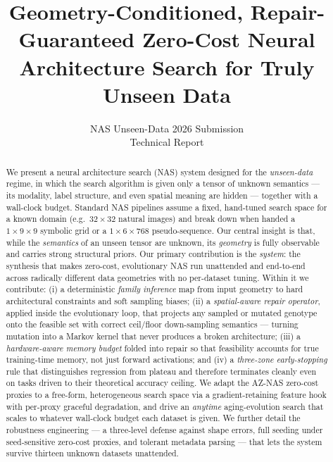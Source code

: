 \documentclass[10pt,twocolumn]{article}
\title{\vspace{-1.5em}\textbf{Geometry-Conditioned, Repair-Guaranteed Zero-Cost
Neural Architecture Search for Truly Unseen Data}}
\author{
NAS Unseen-Data 2026 Submission\\
\small Technical Report
}
\date{}
\begin{document}
\maketitle

\begin{abstract}
We present a neural architecture search (NAS) system designed for the
\emph{unseen-data} regime, in which the search algorithm is given only a tensor
of unknown semantics --- its modality, label structure, and even spatial
meaning are hidden --- together with a wall-clock budget. Standard NAS
pipelines assume a fixed, hand-tuned search space for a known domain (e.g.\
$32{\times}32$ natural images) and break down when handed a $1{\times}9{\times}9$
symbolic grid or a $1{\times}6{\times}768$ pseudo-sequence. Our central insight is
that, while the \emph{semantics} of an unseen tensor are unknown, its
\emph{geometry} is fully observable and carries strong structural priors. Our
primary contribution is the \emph{system}: the synthesis that makes zero-cost,
evolutionary NAS run unattended and end-to-end across radically different data
geometries with no per-dataset tuning. Within it we contribute: (i) a
deterministic \emph{family inference} map from input geometry to hard
architectural constraints and soft sampling biases; (ii) a
\emph{spatial-aware repair operator}, applied inside the evolutionary loop, that
projects any sampled or mutated genotype onto the feasible set with correct
ceil/floor down-sampling semantics --- turning mutation into a Markov kernel
that never produces a broken architecture; (iii) a \emph{hardware-aware memory
budget} folded into repair so that feasibility accounts for true training-time
memory, not just forward activations; and (iv) a \emph{three-zone
early-stopping} rule that distinguishes regression from plateau and therefore
terminates cleanly even on tasks driven to their theoretical accuracy ceiling.
We adapt the AZ-NAS zero-cost proxies to a free-form, heterogeneous search space
via a gradient-retaining feature hook with per-proxy graceful degradation, and
drive an \emph{anytime} aging-evolution search that scales to whatever
wall-clock budget each dataset is given. We further detail the robustness
engineering --- a three-level defense against shape errors, full seeding under
seed-sensitive zero-cost proxies, and tolerant metadata parsing --- that lets
the system survive thirteen unknown datasets unattended.
\end{abstract}

\end{document}
